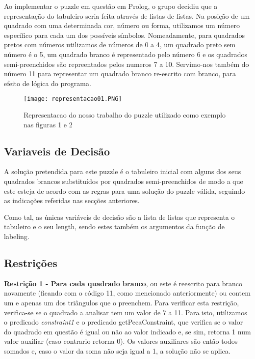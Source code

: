 \documentclass[runningheads]{llncs}
\begin{document}
Ao implementar o puzzle em questão em Prolog, o grupo decidiu que a representação do tabuleiro seria feita através de listas de listas. Na posição de um quadrado com uma determinada cor, número ou forma, utilizamos um número específico para cada um dos possíveis símbolos. Nomeadamente, para quadrados pretos com números utilizamos de números de 0 a 4, um quadrado preto sem número é o 5, um quadrado branco é representado pelo número 6 e os quadrados semi-preenchidos são repreentados pelos numeros 7 a 10. Servimo-nos também do número 11 para representar um quadrado branco re-escrito com branco, para efeito de lógica do programa.

\begin{figure}
\begin{center}
\texttt{[image: representacao01.PNG]}
\caption{Representacao do nosso trabalho do puzzle utilizado como exemplo nas figuras 1 e 2} \label{representacao01}
\end{center}
\end{figure}

\subsection{Variaveis de Decisão}




A solução pretendida para este puzzle é o tabuleiro inicial com alguns dos seus quadrados brancos substituídos por quadrados semi-preenchidos de modo a que este esteja de acordo com as regras para uma solução do puzzle válida, seguindo as indicações referidas nas secções anteriores.


Como tal, as únicas variáveis de decisão são a lista de listas que representa o tabuleiro e o seu length, sendo estes também os argumentos da função de labeling.

\subsection{Restrições}
\textbf{Restrição 1 - Para cada quadrado branco}, ou este é reescrito para branco novamente (ficando com o código 11, como mencionado anteriormente) ou contem um e apenas um dos triângulos que o preenchem. Para verificar esta restrição, verifica-se se o quadrado a analisar tem um valor de 7 a 11. Para isto, utilizamos o predicado \textit{constraint1} e o predicado getPecaConstraint, que verifica se o valor do quadrado em questão é igual ou não ao valor indicado e, se sim, retorna 1 num valor auxiliar (caso contrario retorna 0). Os valores auxiliares são então todos somados e, caso o valor da soma não seja igual a 1, a solução não se aplica.
\end{document}
